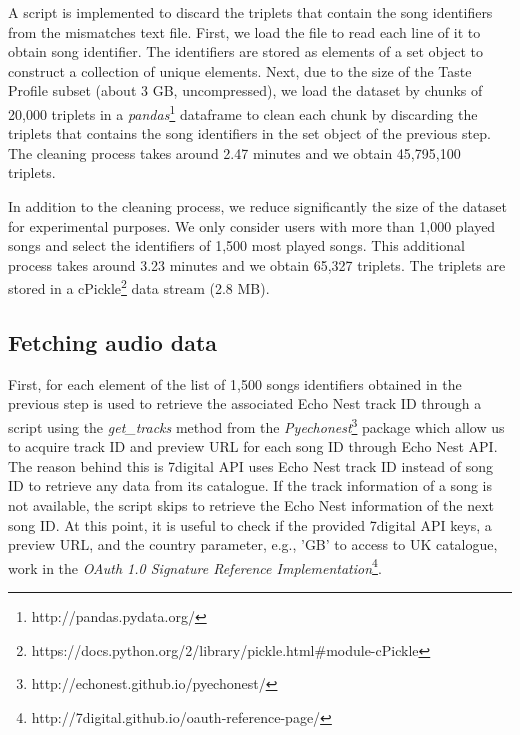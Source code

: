 A script is implemented to discard the triplets that contain the song identifiers from the mismatches text file. First, we load the file to read each line of it to obtain song identifier. The identifiers are stored as elements of a set object to construct a collection of unique elements. Next, due to the size of the Taste Profile subset (about 3 GB, uncompressed), we load the dataset by chunks of 20,000 triplets in a \textit{pandas}\footnote{http://pandas.pydata.org/} dataframe to clean each chunk by discarding the triplets that contains the song identifiers in the set object of the previous step. The cleaning process takes around 2.47 minutes and we obtain 45,795,100 triplets. 

In addition to the cleaning process, we reduce significantly the size of the dataset for experimental purposes. We only consider users with more than 1,000 played songs and select the identifiers of 1,500 most played songs. This additional process takes around 3.23 minutes and we obtain 65,327 triplets. The triplets are stored in a cPickle\footnote{https://docs.python.org/2/library/pickle.html\#module-cPickle} data stream (2.8 MB).


\subsection{Fetching audio data}
First, for each element of the list of 1,500 songs identifiers obtained in the previous step is used to retrieve the associated Echo Nest track ID through a script using the \emph{get\_tracks} method from the \textit{Pyechonest}\footnote{http://echonest.github.io/pyechonest/} package which allow us to acquire track ID and preview URL for each song ID through Echo Nest API. The reason behind this is 7digital API uses Echo Nest track ID instead of song ID to retrieve any data from its catalogue. If the track information of a song is not available, the script skips to retrieve the Echo Nest information of the next song ID. At this point, it is useful to check if the provided 7digital API keys, a preview URL, and the country parameter, e.g., 'GB' to access to UK catalogue, work in the \textit{OAuth 1.0 Signature Reference Implementation}\footnote{http://7digital.github.io/oauth-reference-page/}.

